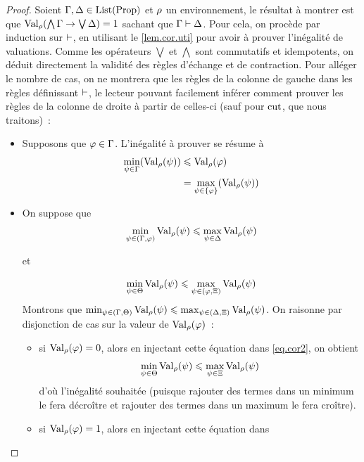 \begin{proof}
  Soient $\Gamma,\Delta\in\operatorname{List}(\operatorname{Prop})$ et $\rho$ un environnement, le résultat
  à montrer est que $\operatorname{Val}_{\rho}(\bigwedge\Gamma\to\bigvee\Delta) = 1$ sachant que
  $\Gamma\vdash\Delta$. Pour cela, on procède par induction sur $\vdash$, en
  utilisant le \cref{lem.cor.uti} pour avoir à prouver l'inégalité de
  valuations. Comme les opérateurs $\bigvee$ et $\bigwedge$ sont commutatifs et
  idempotents, on déduit directement la validité des règles d'échange et de
  contraction. Pour alléger le nombre de cas, on ne montrera que les règles de
  la colonne de gauche dans les règles définissant $\vdash$, le lecteur pouvant
  facilement inférer comment prouver les règles de la colonne de droite à partir
  de celles-ci (sauf pour $\Rcut$, que nous traitons)~:
  \begin{itemize}
  \item[$\Rax$~:] Supposons que $\varphi\in\Gamma$.
    L'inégalité à prouver se résume à
    \begin{align*}
      \min_{\psi \in \Gamma}(\operatorname{Val}_{\rho}(\psi)) &\leqslant \operatorname{Val}_{\rho}(\varphi) \\
      &= \max_{\psi \in \{\varphi\}}(\operatorname{Val}_{\rho}(\psi))
    \end{align*}
  \item[$\Rcut$~:] On suppose que
    \begin{equation}\label{eq.cor1}
      \min_{\psi \in (\Gamma, \varphi)} \operatorname{Val}_{\rho}(\psi) \leqslant
      \max_{\psi \in \Delta} \operatorname{Val}_{\rho}(\psi)
    \end{equation}
    \begin{center}et\end{center}
    \begin{equation}\label{eq.cor2}
      \min_{\psi \in \Theta} \operatorname{Val}_{\rho}(\psi) \leqslant
      \max_{\psi \in (\varphi,\Xi)} \operatorname{Val}_{\rho}(\psi)
    \end{equation}
    Montrons que
    $\min_{\psi \in (\Gamma, \Theta)} \operatorname{Val}_{\rho}(\psi)
    \leqslant \max_{\psi \in (\Delta,\Xi)} \operatorname{Val}_{\rho}(\psi)$.
    On raisonne par disjonction de cas sur la valeur de $\operatorname{Val}_{\rho}(\varphi)$~:
    \begin{itemize}
    \item si $\operatorname{Val}_{\rho}(\varphi) = 0$, alors en injectant cette équation dans
      \ref{eq.cor2}, on obtient
      \[\min_{\psi \in\Theta} \operatorname{Val}_{\rho}(\psi) \leqslant
      \max_{\psi\in \Xi}\operatorname{Val}_{\rho}(\psi)\]
      d'où l'inégalité souhaitée (puisque rajouter des termes dans un minimum
      le fera décroître et rajouter des termes dans un maximum le fera croître).
    \item si $\operatorname{Val}_{\rho}(\varphi) = 1$, alors en injectant cette équation dans

\end{itemize}
\end{itemize}
\end{proof}
